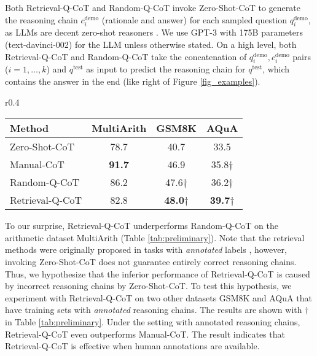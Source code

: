 Both Retrieval-Q-CoT and Random-Q-CoT invoke Zero-Shot-CoT \citep{kojima2022large} to generate the reasoning chain $c^\text{demo}_i$ (rationale and answer) for each sampled question $q^\text{demo}_i$, as LLMs are decent zero-shot reasoners \citep{kojima2022large}. 
We use GPT-3 \citep{brown2020language} with 175B parameters (text-davinci-002) for the LLM unless otherwise stated. 
On a high level, both Retrieval-Q-CoT and Random-Q-CoT take the concatenation of $q^\text{demo}_i, c^\text{demo}_i$ pairs ($i = 1, \ldots, k$) and $q^\text{test}$ as input to predict the reasoning chain for $q^\text{test}$, which contains the answer in the end (like right of Figure \ref{fig_examples}).

\begin{wraptable}{r}{0.4\textwidth}
    \centering
        \caption{Accuracy (\%) of different sampling methods. Symbol $\dagger$  indicates using training sets with annotated reasoning chains. \label{tab:preliminary}}
    \setlength{\tabcolsep}{2pt}
\begin{tabular}{l|c|cc}\toprule
 {Method} & {MultiArith} & {GSM8K} & {AQuA}  \\\midrule
 Zero-Shot-CoT & 78.7 & 40.7 & 33.5  \\
 Manual-CoT & \textbf{91.7} & 46.9 & 35.8$\dagger$ \\
\midrule
Random-Q-CoT & 86.2 & 47.6$\dagger$ & 36.2$\dagger$ \\
Retrieval-Q-CoT & 82.8 & \textbf{48.0}$\dagger$ & \textbf{39.7}$\dagger$ \\
\bottomrule
\end{tabular}
\end{wraptable}

To our surprise, Retrieval-Q-CoT underperforms Random-Q-CoT on the arithmetic dataset MultiArith \citep{multiarith} (Table \ref{tab:preliminary}).
Note that the retrieval methods were originally proposed in tasks with \emph{annotated} labels \citep{rubin2021learning,Su2022SelectiveAM}, however, invoking Zero-Shot-CoT does not guarantee entirely correct reasoning chains. 
Thus, we hypothesize that the inferior performance of Retrieval-Q-CoT is caused by incorrect reasoning chains by Zero-Shot-CoT.
To test this hypothesis, we experiment with Retrieval-Q-CoT on two other datasets GSM8K \citep{gsm8k} and AQuA \citep{aqua} that have training sets with \emph{annotated} reasoning chains. The results are shown with $\dagger$ in Table \ref{tab:preliminary}. Under the setting with annotated reasoning chains, Retrieval-Q-CoT even outperforms Manual-CoT. The result indicates that Retrieval-Q-CoT is effective when human annotations are available. 

